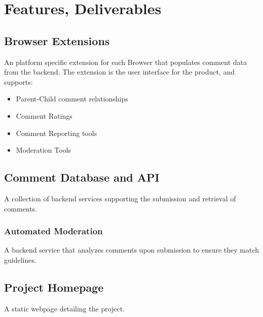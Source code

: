 \documentclass[proposal.tex]{subfiles}
\begin{document}
    
\section{Features, Deliverables}

\subsection*{Browser Extensions}

An platform specific extension for each Browser that populates comment data from the backend.
The extension is the user interface for the product, and supports:

\begin{itemize}
    \item Parent-Child comment relationships
    \item Comment Ratings
    \item Comment Reporting tools
    \item Moderation Tools
\end{itemize}

\subsection*{Comment Database and API}

A collection of backend services supporting the submission and retrieval of comments.

\subsubsection*{Automated Moderation}

A backend service that analyzes comments upon submission to ensure they match guidelines.

\subsection*{Project Homepage}

A static webpage detailing the project.
\end{document}
